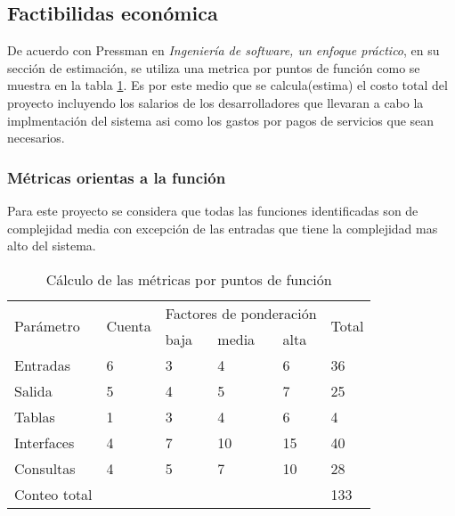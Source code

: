 \subsection{Factibilidas económica}

De acuerdo con Pressman en \textit{Ingeniería de software, un enfoque práctico}\cite{pressman_software_2005}, en su sección de estimación, se utiliza una metrica por puntos de función como se muestra en la tabla \ref{tab:function_point_metrics}. Es por este medio que se calcula(estima) el costo total del proyecto incluyendo los salarios de los desarrolladores que llevaran a cabo la implmentación del sistema asi como los gastos por pagos de servicios que sean necesarios.

\subsubsection{Métricas orientas a la función}


Para este proyecto se considera que todas las funciones identificadas son de complejidad media con excepción de las entradas que tiene la complejidad mas alto del sistema.


\begin{table}
	\begin{tabular}{|l|l|l|l|l|l|}
	\hline
	\multirow{2}{*}{Parámetro} & \multirow{2}{*}{Cuenta} & \multicolumn{3}{|l|}{Factores de ponderación} & \multirow{2}{*}{Total} \\ \cline{3-5}
														 &                         & baja       	& media       & alta		       &                        \\ \hline
	Entradas                   & 6                       & 3            & 4           & 6              & 36                     \\ \hline
	Salida                     & 5                       & 4            & 5           & 7              & 25                     \\ \hline
	Tablas                     & 1                       & 3            & 4           & 6              & 4                      \\ \hline
	Interfaces                 & 4                       & 7            & 10          & 15             & 40                     \\ \hline
	Consultas                  & 4                       & 5            & 7           & 10             & 28                     \\ \hline
	Conteo total               &                         &              &             &		             & 133                    \\ \hline
	\end{tabular}
	\caption{Cálculo de las métricas por puntos de función}
	\label{tab:function_point_metrics}
	\end{table}


